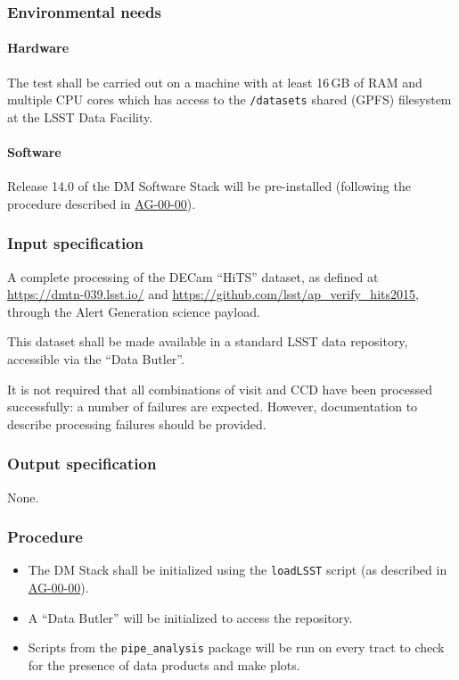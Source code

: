 \subsubsection{Environmental needs}

\paragraph{Hardware}

The test shall be carried out on a machine with at least 16\,GB of RAM and
multiple CPU cores which has access to the \texttt{/datasets} shared (GPFS)
filesystem at the LSST Data Facility.

\paragraph{Software}

Release 14.0 of the DM Software Stack will be pre-installed (following the
procedure described in \hyperref[ag-00-00]{AG-00-00}).

\subsubsection{Input specification}

A complete processing of the DECam ``HiTS'' dataset, as defined at
\url{https://dmtn-039.lsst.io/} and
\url{https://github.com/lsst/ap_verify_hits2015}, through the Alert
Generation science payload.

This dataset shall be made available in a standard LSST data repository,
accessible via the ``Data Butler''.

It is not required that all combinations of visit and CCD have been processed
successfully: a number of failures are expected. However, documentation to
describe processing failures should be provided.

\subsubsection{Output specification}

None.

\subsubsection{Procedure}

\begin{itemize}

  \item{The DM Stack shall be initialized using the \texttt{loadLSST} script
  (as described in \hyperref[ag-00-00]{AG-00-00}).}

  \item{A ``Data Butler'' will be initialized to access the repository.}

  \item{Scripts from the \texttt{pipe\_analysis} package will be run on
	  every tract to check for the presence of data products and make
		plots.}

\end{itemize}
